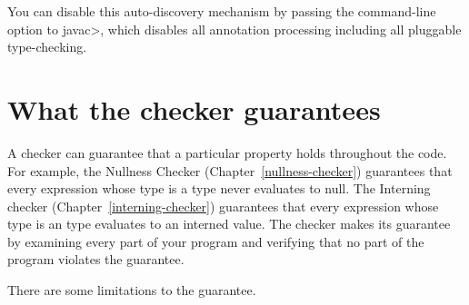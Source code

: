 You can disable this auto-discovery mechanism by passing the
 command-line option to \<javac>, which disables all
annotation processing including all pluggable type-checking.




\section{What the checker guarantees\label{checker-guarantees}}

A checker can guarantee that a particular property holds throughout the
code.  For example, the Nullness Checker (Chapter~\ref{nullness-checker})
guarantees that every expression whose type is a  type never
evaluates to null.  The Interning checker (Chapter~\ref{interning-checker})
guarantees that every expression whose type is an  type
evaluates to an interned value.  The checker makes its guarantee by
examining every part of your program and verifying that no part of the
program violates the guarantee.

There are some limitations to the guarantee.


